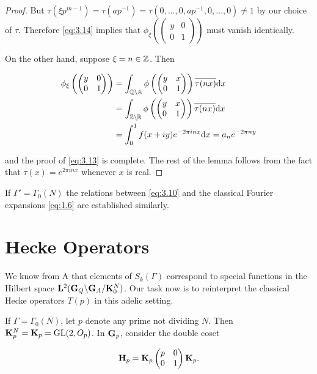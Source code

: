 \begin{proof}
But $\tau(\xi p^{m-1}) = \tau(ap^{-1}) = \tau(0,\dots,0,ap^{-1},0,\dots,0) \neq 1$ by our choice of $\tau$. Therefore \eqref{eq:3.14} implies that $\phi_\xi\left(\begin{pmatrix} y & 0 \\ 0 & 1 \end{pmatrix}\right)$ must vanish identically.

On the other hand, suppose $\xi = n \in \mathbb{Z}$. Then

\[
\begin{aligned}
\phi_\xi\left(\begin{pmatrix} y & 0 \\ 0 & 1 \end{pmatrix}\right) &= \int_{\mathbb{Q}\backslash\mathbb{A}}\phi\left(\begin{pmatrix} y & x \\ 0 & 1 \end{pmatrix}\right)\overline{\tau(nx)}\mathrm{d} x\\
&= \int_{\mathbb{Z}\backslash\mathbb{R}}\phi\left(\begin{pmatrix} y & x \\ 0 & 1 \end{pmatrix}\right)\overline{\tau(nx)}\mathrm{d} x\\
&= \int_0^1 f(x+iy)e^{-2\pi inx}\mathrm{d} x = a_n e^{-2\pi ny}
\end{aligned}
\]

and the proof of \eqref{eq:3.13} is complete. The rest of the lemma follows from the fact that $\tau(x) = e^{2\pi inx}$ whenever $x$ is real.

\end{proof}

If $\Gamma' = \Gamma_0(N)$ the relations between \eqref{eq:3.10} and the classical Fourier expansions \eqref{eq:1.6} are established similarly.

\section{Hecke Operators}\label{sec:3b}

We know from A that elements of $S_k(\Gamma)$ correspond to special functions in the Hilbert space $\mathbf{L}^2(\mathbf{G}_Q\backslash\mathbf{G}_A/\mathbf{K}_0^N)$. Our task now is to reinterpret the classical Hecke operators $T(p)$ in this adelic setting.

If $\Gamma = \Gamma_0(N)$, let $p$ denote any prime not dividing $N$. Then $\mathbf{K}_p^N = \mathbf{K}_p = \operatorname{GL}(2,O_p)$. In $\mathbf{G}_p$, consider the double coset

\[
\mathbf{H}_p = \mathbf{K}_p\begin{pmatrix} p & 0 \\ 0 & 1 \end{pmatrix}\mathbf{K}_p.
\]

